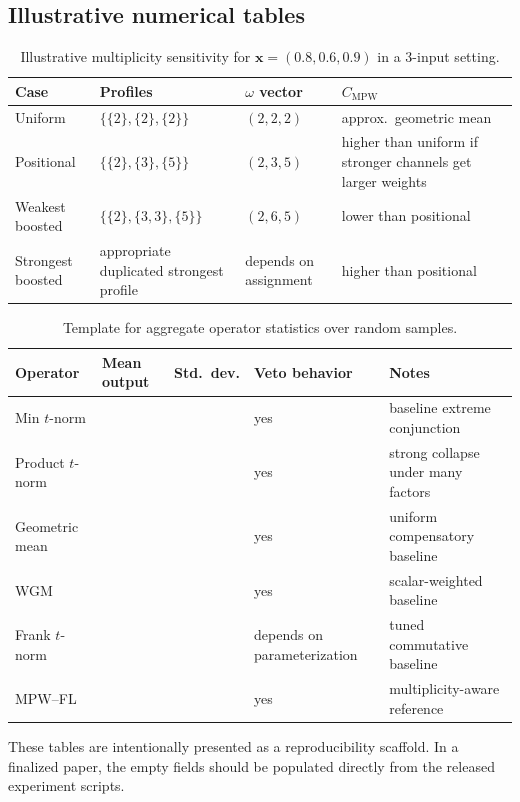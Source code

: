 \documentclass[11pt]{article}
\begin{document}
\subsection{Illustrative numerical tables}

\begin{table}[ht]
\centering
\caption{Illustrative multiplicity sensitivity for $\mathbf{x}=(0.8,0.6,0.9)$ in a 3-input setting.}
\label{tab:appendix-multiplicity}
\begin{tabular}{p{3.2cm}p{3.5cm}p{2.4cm}p{2.6cm}}
\hline
\textbf{Case} & \textbf{Profiles} & \textbf{$\omega$ vector} & \textbf{$C_{\mathrm{MPW}}$} \\
\hline
Uniform &
$\{\{2\},\{2\},\{2\}\}$ &
$(2,2,2)$ &
approx.\ geometric mean \\
Positional &
$\{\{2\},\{3\},\{5\}\}$ &
$(2,3,5)$ &
higher than uniform if stronger channels get larger weights \\
Weakest boosted &
$\{\{2\},\{3,3\},\{5\}\}$ &
$(2,6,5)$ &
lower than positional \\
Strongest boosted &
appropriate duplicated strongest profile &
depends on assignment &
higher than positional \\
\hline
\end{tabular}
\end{table}

\begin{table}[ht]
\centering
\caption{Template for aggregate operator statistics over random samples.}
\label{tab:appendix-benchmark-template}
\begin{tabular}{p{3.2cm}p{2cm}p{2cm}p{2cm}p{3cm}}
\hline
\textbf{Operator} & \textbf{Mean output} & \textbf{Std.\ dev.} & \textbf{Veto behavior} & \textbf{Notes} \\
\hline
Min $t$-norm & & & yes & baseline extreme conjunction \\
Product $t$-norm & & & yes & strong collapse under many factors \\
Geometric mean & & & yes & uniform compensatory baseline \\
WGM & & & yes & scalar-weighted baseline \\
Frank $t$-norm & & & depends on parameterization & tuned commutative baseline \\
MPW--FL & & & yes & multiplicity-aware reference \\
\hline
\end{tabular}
\end{table}

These tables are intentionally presented as a reproducibility scaffold. In a finalized paper, the empty fields should be populated directly from the released experiment scripts.
\end{document}
